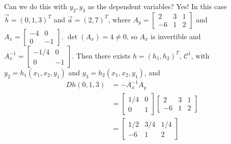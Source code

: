 \begin{example}
    Can we do this with $y_2,y_3$ as the dependent variables? Yes! In this case $\vec{b} = (0,1,3)^T$ and $\vec{a} = (2,7)^T$, where $A_y = \begin{bmatrix} 2 & 3 & 1 \\ -6 & 1 & 2 \end{bmatrix}$ and $A_x = \begin{bmatrix} -4 & 0 \\ 0 & -1 \end{bmatrix}$. $\det(A_x) = 4\neq 0$, so $A_x$ is invertible and $A_x^{-1} = \begin{bmatrix} -1/4 & 0 \\ 0 & -1 \end{bmatrix}$. Then there exists $h = (h_1,h_2)^T$, $\mathcal{C}^1$, with $y_2 = h_1(x_1,x_2,y_1)$ and $y_3 = h_2(x_1,x_2,y_1)$, and \begin{align*}
        Dh(0,1,3) &= -A_x^{-1}A_y \\
        &= \begin{bmatrix} 1/4 & 0 \\ 0 & 1 \end{bmatrix}\begin{bmatrix} 2 & 3 & 1 \\ -6 & 1 & 2 \end{bmatrix} \\
        &= \begin{bmatrix} 1/2 & 3/4 & 1/4 \\ -6 & 1 & 2 \end{bmatrix}
    \end{align*}
\end{example}

